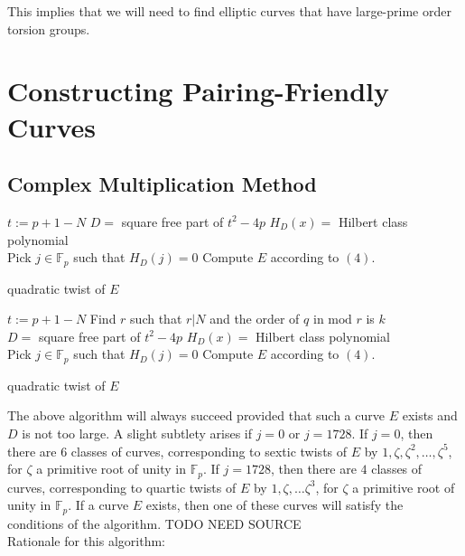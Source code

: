 \documentclass[12pt,twoside]{article}
\begin{document}
This implies that we will need to find elliptic curves that have large-prime order torsion groups. 




\section{Constructing Pairing-Friendly Curves} 

\subsection{Complex Multiplication Method} 

\begin{algorithm}[H]
 $t := p+1 - N$\; 
 $D = $ square free part of $t^2-4p$\;
 $H_D(x) = $ Hilbert class polynomial \\
 Pick $j \in \mathbb F_p$ such that $H_D(j) = 0$
 Compute $E$ according to $(4)$.
 
  {
 }
 {\Return quadratic twist of $E$}
 \end{algorithm}
 \bigskip
 
 
\begin{algorithm}[H]
 $t := p+1 - N$\; 
 Find $r$ such that $r | N$ and the order of $q$ in $\textrm{mod  } r$ is $k$ \\
 $D = $ square free part of $t^2-4p$\;
 $H_D(x) = $ Hilbert class polynomial \\
 Pick $j \in \mathbb F_p$ such that $H_D(j) = 0$
 Compute $E$ according to $(4)$.
 
  {
 }
 {\Return quadratic twist of $E$}
 \end{algorithm}
 \bigskip 
 
 
 
 
 
 
 
 
\noindent The above algorithm will always succeed provided that such a curve $E$ exists and $D$ is not too large. A slight subtlety arises if $j = 0$ or $j = 1728$. If $j = 0$, then there are $6$ classes of curves, corresponding to sextic twists of $E$ by $1, \zeta, \zeta^2, \dots, \zeta^5$, for $\zeta$ a primitive root of unity in $\mathbb F_p$. If $j = 1728$, then there are $4$ classes of curves, corresponding to quartic twists of $E$ by $1, \zeta, \dots \zeta^3$, for $\zeta$ a primitive root of unity in $\mathbb F_p$. If a curve $E$ exists, then one of these curves will satisfy the conditions of the algorithm. TODO NEED SOURCE
\\ 
Rationale for this algorithm: 










 

\end{document}
